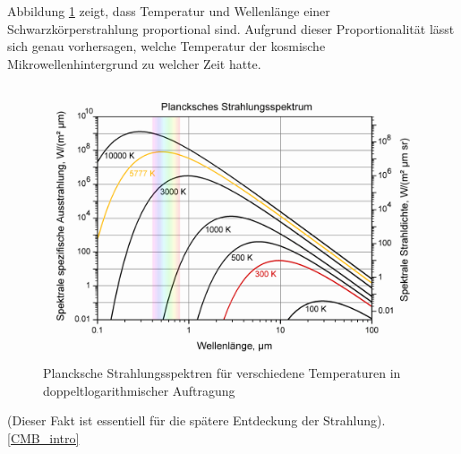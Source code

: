 Abbildung \ref{fig:blackbody_spectrum} zeigt, dass Temperatur und Wellenlänge einer Schwarzkörperstrahlung proportional sind.
Aufgrund dieser Proportionalität lässt sich genau vorhersagen, welche Temperatur der kosmische Mikrowellenhintergrund zu welcher Zeit hatte.
\begin{figure}
	\centering
	\includegraphics[width=\linewidth]{cmb/images/blackbody_spectrum.png}
	\caption{Plancksche Strahlungsspektren für verschiedene Temperaturen in doppeltlogarithmischer Auftragung}
	\label{fig:blackbody_spectrum}
\end{figure}
(Dieser Fakt ist essentiell für die spätere Entdeckung der Strahlung).
\ref{CMB_intro}
